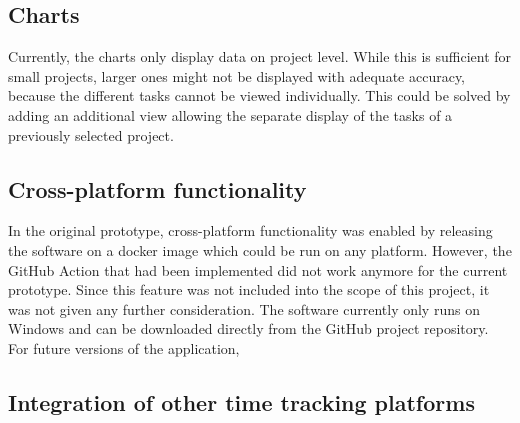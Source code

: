 \subsection{Charts}
Currently, the charts only display data on project level. While this is sufficient for small projects, larger ones might not be displayed with adequate accuracy, because the different tasks cannot be viewed individually. This could be solved by adding an additional view allowing the separate display of the tasks of a previously selected project.

\subsection{Cross-platform functionality}
In the original prototype, cross-platform functionality was enabled by releasing the software on a docker image which could be run on any platform. However, the GitHub Action that had been implemented did not work anymore for the current prototype. Since this feature was not included into the scope of this project, it was not given any further consideration. The software currently only runs on Windows and can be downloaded directly from the GitHub project repository. For future versions of the application, 

\subsection{Integration of other time tracking platforms}